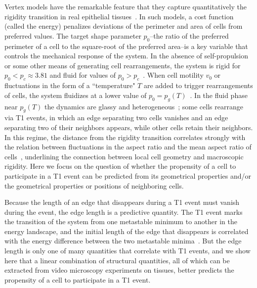 \documentclass[twoside,twocolumn,9pt]{article}
\begin{document}
Vertex models have the remarkable feature that they capture quantitatively the rigidity transition in real epithelial tissues~\cite{bi2015density,park2015unjamming}. In such models, a cost function (called the energy) penalizes deviations of the perimeter and area of cells from preferred values. The target shape parameter $p_0$--the ratio of the preferred perimeter of a cell to the square-root of the preferred area--is a key variable that controls the mechanical response of the system. In the absence of self-propulsion or some other means of generating cell rearrangements, the system is rigid for $p_0<p_c \approx 3.81$ and fluid for values of $p_0>p_c$~\cite{bi2015density}. When cell motility $v_0$ or fluctuations in the form of a ``temperature" $T$ are added to trigger rearrangements of cells, the system fluidizes at a lower value of $p_0=p_g(T)$~\cite{bi2,SussmanPaoluzziMarchetti2018}. In the fluid phase near $p_g(T)$ the dynamics are glassy and heterogeneous~\cite{SussmanPaoluzziMarchetti2018}; some cells rearrange via T1 events, in which an edge separating two cells vanishes and an edge separating two of their neighbors appears, while other cells retain their neighbors. In this 
regime, the distance from the rigidity transition correlates strongly with the relation between fluctuations in the aspect ratio and the mean aspect ratio of cells~\cite{atia2018geometric}, underlining the connection between local cell geometry and macroscopic rigidity. Here we focus on the question of whether the propensity of a cell to participate in a T1 event can be predicted from its geometrical properties and/or the geometrical properties or positions of neighboring cells. 

Because the length of an edge that disappears during a T1 event must vanish during the event, the edge length is a predictive quantity. The T1 event marks the transition of the system from one metastable minimum to another in the energy landscape, and the initial length of the edge that disappears is correlated with the energy difference between the two metastable minima~\cite{kimHilgenfeldt2018universal}.  But the edge length is only one of many quantities that correlate with T1 events, and we show here that a linear combination of structural quantities, all of which can be extracted from video microscopy experiments on tissues, better predicts the propensity of a cell to participate in a T1 event.
\end{document}
